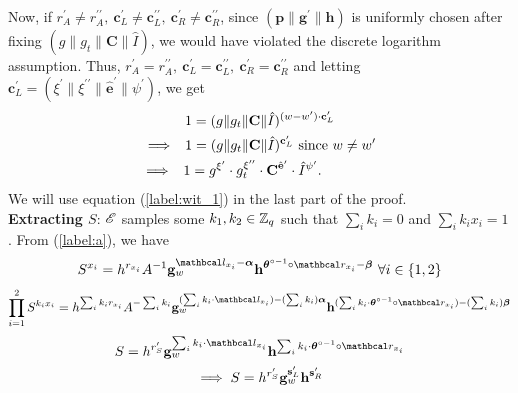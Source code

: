 Now, if $r_A^{\prime} \neq r_A^{\prime \prime}, \ \textbf{c}_{L}^{\prime} \neq \textbf{c}_{L}^{\prime \prime}, \ \textbf{c}_{R}^{\prime} \neq \textbf{c}_{R}^{\prime \prime}$, since $(\textbf{p}\| \textbf{g}^{\prime} \| \textbf{h})$ is uniformly chosen after fixing $(g \| g_t \| \textbf{C} \| \hat{I})$, 
we would have violated the discrete logarithm assumption. Thus, $r_A^{\prime} = r_A^{\prime \prime}, \ \textbf{c}_{L}^{\prime} = \textbf{c}_{L}^{\prime \prime}, \ \textbf{c}_{R}^{\prime} = \textbf{c}_{R}^{\prime \prime}$ and letting $\textbf{c}_L^{\prime} = (\xi^{\prime} \| \xi^{\prime \prime} \| \hat{\textbf{e}}^{\prime} \| \psi^{\prime})$,
we get 
\begin{gather}
1 = (g \| g_t \| \textbf{C} \| \hat{I})^{(w-w^{\prime}) \cdot \textbf{c}_L^{\prime}} \nonumber \\
\implies \hspace{1.8mm} 1 = (g \| g_t \| \textbf{C} \| \hat{I})^{\textbf{c}_L^{\prime}} \text{  since } w \neq w^{\prime} \nonumber \\
\hspace{-14.1mm} \implies \hspace{1.8mm} 1 = g^{\xi^{\prime}} \cdot g_t^{\xi^{\prime \prime}} \cdot \textbf{C}^{\hat{\textbf{e}}^{\prime}} \cdot \hat{I}^{\psi^{\prime}}. \label{label:wit_1}
\end{gather}
We will use equation (\ref{label:wit_1}) in the last part of the proof.\\

\noindent
\textbf{Extracting $S$}: $\mathscr{E}$ samples some $k_1, k_2 \in \mathbb{Z}_q$ such that $\sum_{i}k_i=0$ and $\sum_{i}k_ix_i=1$. From (\ref{label:a}), we have
\begin{gather*}
    S^{x_i} = h^{r_{x_i}} A^{-1} \textbf{g}_w^{\lvec_{x_i} - \vecnb{\alpha}} \textbf{h}^{\vecnb{\theta}^{\circ -1} \circ \rvec_{x_i} - \vecnb{\beta}} \ \forall i \in \{1,2\}
\end{gather*}
\begin{align*}
  \prod_{i=1}^{2}S^{k_ix_i} = h^{\sum_i k_ir_{x_i}} 
    A^{-\sum_i k_i} 
    \textbf{g}_w^{(\sum_i k_i \cdot \lvec_{x_i}) - (\sum_i k_i)\vecnb{\alpha}} 
    \textbf{h}^{( \sum_i k_i \cdot \vecnb{\theta}^{\circ -1} \circ \rvec_{x_i}) - (\sum_i k_i)\vecnb{\beta}}
\end{align*}
\begin{gather}
S = h^{r_S^{\prime}} \textbf{g}_w^{\sum_i k_i \cdot \lvec_{x_i}} \textbf{h}^{\sum_i k_i \cdot \vecnb{\theta}^{\circ -1} \circ \rvec_{x_i}}\\
\implies S = h^{r_S^{\prime}} \textbf{g}_w^{\textbf{s}_L^{\prime}} \textbf{h}^{\textbf{s}_R^{\prime}} 
\end{gather}

